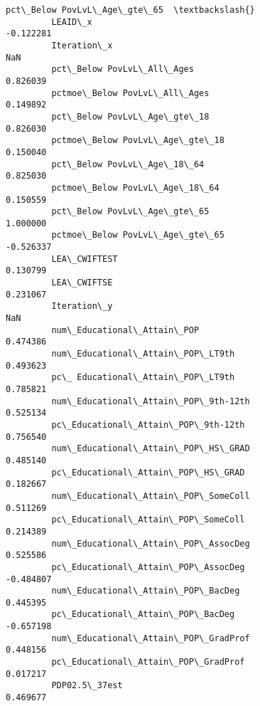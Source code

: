 \documentclass[11pt]{article}
\begin{document}
\begin{Verbatim}[commandchars=\\\{\}]
                                                    pct\_Below PovLvL\_Age\_gte\_65  \textbackslash{}
         LEAID\_x                                                      -0.122281   
         Iteration\_x                                                        NaN   
         pct\_Below PovLvL\_All\_Ages                                     0.826039   
         pctmoe\_Below PovLvL\_All\_Ages                                  0.149892   
         pct\_Below PovLvL\_Age\_gte\_18                                   0.826030   
         pctmoe\_Below PovLvL\_Age\_gte\_18                                0.150040   
         pct\_Below PovLvL\_Age\_18\_64                                    0.825030   
         pctmoe\_Below PovLvL\_Age\_18\_64                                 0.150559   
         pct\_Below PovLvL\_Age\_gte\_65                                   1.000000   
         pctmoe\_Below PovLvL\_Age\_gte\_65                               -0.526337   
         LEA\_CWIFTEST                                                  0.130799   
         LEA\_CWIFTSE                                                   0.231067   
         Iteration\_y                                                        NaN   
         num\_Educational\_Attain\_POP                                    0.474386   
         num\_Educational\_Attain\_POP\_LT9th                              0.493623   
         pc\_ Educational\_Attain\_POP\_LT9th                              0.785821   
         num\_Educational\_Attain\_POP\_9th-12th                           0.525134   
         pc\_Educational\_Attain\_POP\_9th-12th                            0.756540   
         num\_Educational\_Attain\_POP\_HS\_GRAD                            0.485140   
         pc\_Educational\_Attain\_POP\_HS\_GRAD                             0.182667   
         num\_Educational\_Attain\_POP\_SomeColl                           0.511269   
         pc\_Educational\_Attain\_POP\_SomeColl                            0.214389   
         num\_Educational\_Attain\_POP\_AssocDeg                           0.525586   
         pc\_Educational\_Attain\_POP\_AssocDeg                           -0.484807   
         num\_Educational\_Attain\_POP\_BacDeg                             0.445395   
         pc\_Educational\_Attain\_POP\_BacDeg                             -0.657198   
         num\_Educational\_Attain\_POP\_GradProf                           0.448156   
         pc\_Educational\_Attain\_POP\_GradProf                            0.017217   
         PDP02.5\_37est                                                 0.469677   

\end{Verbatim}
\end{document}
